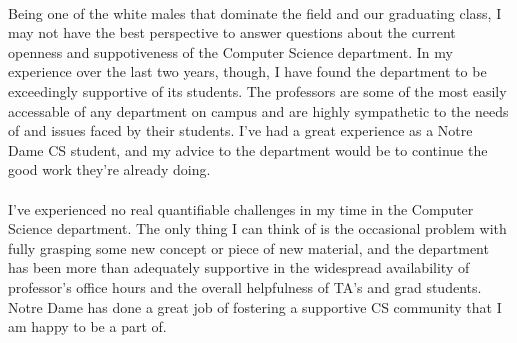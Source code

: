 \documentclass{article}
\begin{document}
    \paragraph{}
    Being one of the white males that dominate the field and our graduating class, I may not have the best perspective to answer questions about the current openness and suppotiveness of the Computer Science department. In my experience over the last two years, though, I have found the department to be exceedingly supportive of its students. The professors are some of the most easily accessable of any department on campus and are highly sympathetic to the needs of and issues faced by their students. I've had a great experience as a Notre Dame CS student, and my advice to the department would be to continue the good work they're already doing.
    \paragraph{}
    I've experienced no real quantifiable challenges in my time in the Computer Science department. The only thing I can think of is the occasional problem with fully grasping some new concept or piece of new material, and the department has been more than adequately supportive in the widespread availability of professor's office hours and the overall helpfulness of TA's and grad students. Notre Dame has done a great job of fostering a supportive CS community that I am happy to be a part of.
\end{document}
